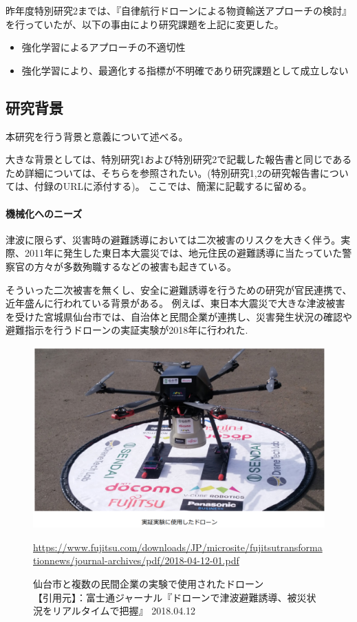 \documentclass{article}[jsarticle]
\begin{document}
昨年度特別研究2までは、『自律航行ドローンによる物資輸送アプローチの検討』を行っていたが、以下の事由により研究課題を上記に変更した。
\begin{itemize}
    \item 強化学習によるアプローチの不適切性
    \item 強化学習により、最適化する指標が不明確であり研究課題として成立しない
\end{itemize}

\subsection{研究背景}
本研究を行う背景と意義について述べる。\par 
大きな背景としては、特別研究1および特別研究2で記載した報告書と同じであるため詳細については、そちらを参照されたい。(特別研究1,2の研究報告書については、付録のURLに添付する)。
ここでは、簡潔に記載するに留める。\par

\paragraph{機械化へのニーズ}
津波に限らず、災害時の避難誘導においては二次被害のリスクを大きく伴う。実際、2011年に発生した東日本大震災では、地元住民の避難誘導に当たっていた警察官の方々が多数殉職するなどの被害も起きている。
\par
そういった二次被害を無くし、安全に避難誘導を行うための研究が官民連携で、近年盛んに行われている背景がある。
例えば、東日本大震災で大きな津波被害を受けた宮城県仙台市では、自治体と民間企業が連携し、災害発生状況の確認や避難指示を行うドローンの実証実験が2018年に行われた.
\begin{figure}[H]
    \centering
    \includegraphics[scale=0.5]{./images/drone1.png}
    \caption{
       仙台市と複数の民間企業の実験で使用されたドローン \\
    【引用元】：富士通ジャーナル『ドローンで津波避難誘導、被災状況をリアルタイムで把握』 2018.04.12 \\
    }
    \url{https://www.fujitsu.com/downloads/JP/microsite/fujitsutransformationnews/journal-archives/pdf/2018-04-12-01.pdf}
\end{figure}
\end{document}
